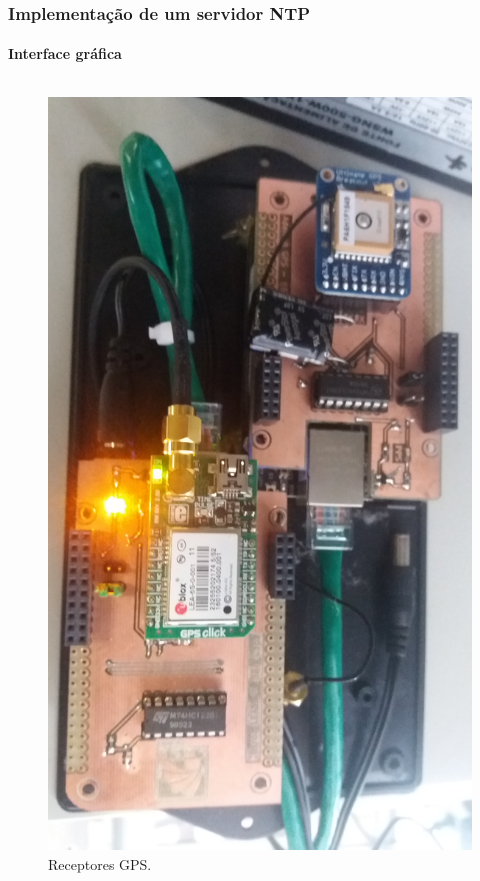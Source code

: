 \begin{frame}
\frametitle{Implementação de um servidor NTP}
\framesubtitle{Interface gráfica} 
\begin{columns}
\begin{column}{.5\textwidth}
\begin{figure}[h]
    \centering
    \includegraphics[width=\textwidth]{image/gps}
    \caption {Receptores GPS.}
    \label{img:gpses} 
\end{figure}
\end{column} 

\end{columns}
\end{frame}
